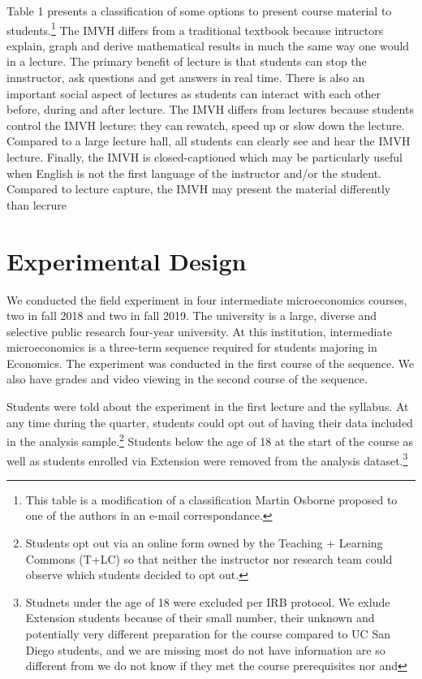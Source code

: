 \documentclass[12pt]{article}
\begin{document}
Table 1 presents a classification of some options to present course material to students.\footnote{This table is a modification of a classification Martin Osborne proposed to one of the authors in an e-mail correspondance.} The IMVH differs from a traditional textbook because intructors explain, graph and derive mathematical results in much the same way one would in a lecture.  The primary benefit of lecture is that students can stop the innstructor, ask questions and get answers in real time.  There is also an important social aspect of lectures as students can interact with each other before, during and after lecture. The IMVH differs from lectures because students control the IMVH lecture:  they can rewatch, speed up or slow down the lecture.  Compared to a large lecture hall, all students can clearly see and hear the IMVH lecture.  Finally, the IMVH is closed-captioned which may be particularly useful when English is not the first language of the instructor and/or the student.  Compared to lecture capture, the IMVH may present the material differently than lecrure 


\section{Experimental Design} \label{expdesign}
We conducted the field experiment in four intermediate microeconomics courses, two in fall 2018 and two in fall 2019.  The university is a large, diverse and selective public research four-year university. At this institution, intermediate microeconomics is a three-term sequence required for students majoring in Economics. The experiment was conducted in the first course of the sequence.  We also have grades and video viewing in the second course of the sequence.

Students were told about the experiment in the first lecture and the syllabus. At any time during the quarter, students could opt out of having their data included in the analysis sample.\footnote{Students opt out via an online form owned by the Teaching + Learning Commons (T+LC) so that neither the instructor nor research team could observe which students decided to opt out.} Students below the age of 18 at the start of the course as well as students enrolled via Extension were removed from the analysis dataset.\footnote{Studnets under the age of 18 were excluded per IRB protocol.  We exlude Extension students because of their small number, their unknown and potentially very different preparation for the course compared to UC San Diego students, and we are missing most do not have information are so different from we do not know if they met the course prerequisites nor and }
\end{document}
